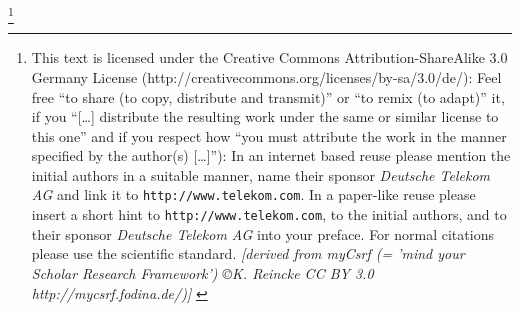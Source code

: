%
%
%
%
%
\footnote{
This text is licensed under the Creative Commons Attribution-ShareAlike 3.0 Germany
License (http://creativecommons.org/licenses/by-sa/3.0/de/): Feel free \enquote{to
share (to copy, distribute and transmit)} or \enquote{to remix (to
adapt)} it, if you \enquote{[\ldots] distribute the resulting work under the
same or similar license to this one} and if you respect how \enquote{you
must attribute the work in the manner specified by the author(s)
[\ldots]}):
\newline
In an internet based reuse please mention the initial authors in a suitable
manner, name their sponsor \textit{Deutsche Telekom AG} and link it to
\texttt{http://www.telekom.com}. In a paper-like reuse please insert a short
hint to \texttt{http://www.telekom.com}, to the initial authors, and to their
sponsor \textit{Deutsche Telekom AG} into your preface. For normal citations
please use the scientific standard.
\newline
{ \tiny \itshape [derived from myCsrf (= 'mind your Scholar Research Framework') 
\copyright K. Reincke CC BY 3.0  http://mycsrf.fodina.de/)] }}

